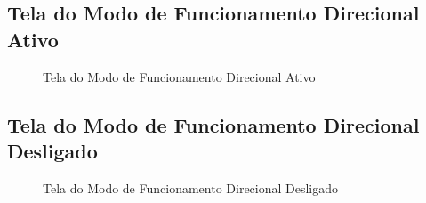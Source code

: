 \subsection{Tela do Modo de Funcionamento Direcional Ativo}
\begin{figure}[H]
\centering
{}
\caption{Tela do Modo de Funcionamento Direcional Ativo}
\end{figure}

\subsection{Tela do Modo de Funcionamento Direcional Desligado}
\begin{figure}[H]
\centering
{}
\caption{Tela do Modo de Funcionamento Direcional Desligado}
\end{figure}

